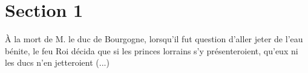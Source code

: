 \documentclass{article}
\begin{document}
\section{Section 1}



\`A la mort de M. le \gls{duc} de Bourgogne, lorsqu'il fut question d'aller jeter de l'eau b\'enite, le feu Roi d\'ecida que si les princes lorrains s'y pr\'esenteroient, qu'eux ni les \gls{ducs} n'en jetteroient (...)



\printindex

\printglossaries
\end{document}
